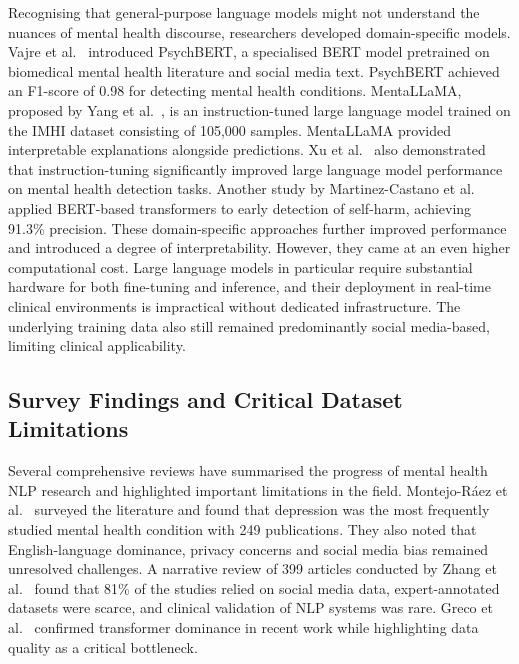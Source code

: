 \documentclass[11pt]{article}
\begin{document}
Recognising that general-purpose language models might not understand the nuances of mental
health discourse, researchers developed domain-specific models. Vajre et
al.~\cite{vajre2021psychbert} introduced PsychBERT, a specialised BERT model pretrained on
biomedical mental health literature and social media text. PsychBERT achieved an F1-score of
0.98 for detecting mental health conditions. MentaLLaMA, proposed by Yang et
al.~\cite{yang2024mentallama}, is an instruction-tuned large language model trained on the IMHI
dataset consisting of 105,000 samples. MentaLLaMA provided interpretable explanations alongside
predictions. Xu et al.~\cite{xu2024mental} also demonstrated that instruction-tuning
significantly improved large language model performance on mental health detection tasks. Another
study by Martinez-Castano et al.~\cite{martinez2022early} applied BERT-based transformers to
early detection of self-harm, achieving 91.3\% precision. These domain-specific approaches
further improved performance and introduced a degree of interpretability. However, they came at
an even higher computational cost. Large language models in particular require substantial
hardware for both fine-tuning and inference, and their deployment in real-time clinical
environments is impractical without dedicated infrastructure. The underlying training data also
still remained predominantly social media-based, limiting clinical applicability.

\subsection{Survey Findings and Critical Dataset Limitations}

Several comprehensive reviews have summarised the progress of mental health NLP research and
highlighted important limitations in the field. Montejo-R\'{a}ez et al.~\cite{montejo2024survey}
surveyed the literature and found that depression was the most frequently studied mental health
condition with 249 publications. They also noted that English-language dominance, privacy
concerns and social media bias remained unresolved challenges. A narrative review of 399 articles
conducted by Zhang et al.~\cite{zhang2022natural} found that 81\% of the studies relied on
social media data, expert-annotated datasets were scarce, and clinical validation of NLP systems
was rare. Greco et al.~\cite{greco2023transformer} confirmed transformer dominance in recent work
while highlighting data quality as a critical bottleneck.
\end{document}

